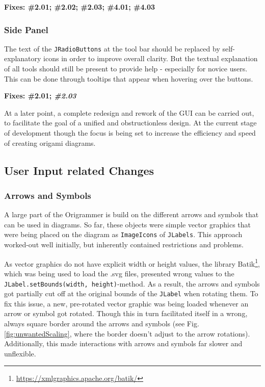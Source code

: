 \textbf{Fixes: \#2.01; \#2.02; \#2.03; \#4.01; \#4.03}\\

\newpage
\subsubsection{Side Panel}

The text of the \texttt{JRadioButtons} at the tool bar should be replaced by self-explanatory icons in order to improve overall clarity. But the textual explanation of all tools should still be present to provide help - especially for novice users. This can be done through tooltips that appear when hovering over the buttons.

\textbf{Fixes: \#2.01; \emph{\#2.03}}
\newline

\noindent At a later point, a complete redesign and rework of the GUI can be carried out, to facilitate the goal of a unified and obstructionless design. At the current stage of development though the focus is being set to increase the efficiency and speed of creating origami diagrams.

\subsection{User Input related Changes}

\subsubsection{Arrows and Symbols}
A large part of the Origrammer is build on the different arrows and symbols that can be used in diagrams. So far, these objects were simple vector graphics that were being placed on the diagram as \texttt{ImageIcons} of \texttt{JLabels}. This approach worked-out well initially, but inherently contained restrictions and problems.

As vector graphics do not have explicit width or height values, the library Batik\footnote{\url{https://xmlgraphics.apache.org/batik/}}, which was being used to load the .svg files, presented wrong values to the \texttt{JLabel.setBounds(width, height)}-method. As a result, the arrows and symbols got partially cut off at the original bounds of the \texttt{JLabel} when rotating them. To fix this issue, a new, pre-rotated vector graphic was being loaded whenever an arrow or symbol got rotated. Though this in turn facilitated itself in a wrong, always square border around the arrows and symbols (see Fig. \ref{fig:unwantedScaling}, where the border doesn't adjust to the arrow rotations). Additionally, this made interactions with arrows and symbols far slower and unflexible.

